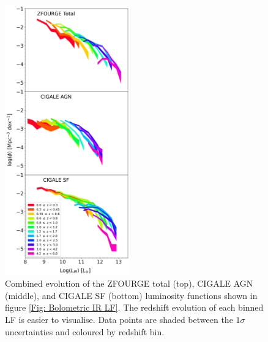 \begin{figure}
    \centering
    \includegraphics[width=0.48\textwidth]{Figures/LF Filled.png}
    \caption{Combined evolution of the ZFOURGE total (top), CIGALE AGN (middle), and CIGALE SF (bottom) luminosity functions shown in figure \ref{Fig: Bolometric IR LF}. The redshift evolution of each binned LF is easier to visualise. Data points are shaded between the $1\sigma$ uncertainties and coloured by redshift bin.}
    \label{Fig: LF Filled}
\end{figure}

